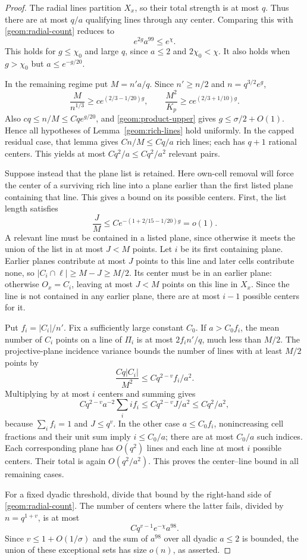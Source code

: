 \begin{proof}
The radial lines partition $X_x$, so their total strength is at most
$q$. Thus there are at most $q/a$ qualifying lines through any
center. Comparing this with \eqref{geom:radial-count} reduces to
\[
 e^{2g}a^{99}\leq e^\chi.
\]
This holds for $g\leq\chi_0$ and large $q$, since $a\leq2$ and
$2\chi_0<\chi$. It also holds when $g>\chi_0$ but
$a\leq e^{-g/20}$.

In the remaining regime put $M=n'a/q$. Since $n'\geq n/2$ and
$n=q^{3/2}e^g$,
\[
 \frac M{n^{1/3}}\geq c e^{(2/3-1/20)g},\qquad
 \frac{M^2}{K_p}\geq c e^{(2/3+1/10)g}.
\]
Also $cq\leq n/M\leq Cqe^{g/20}$, and
\eqref{geom:product-upper} gives $g\leq\sigma/2+O(1)$.
Hence all hypotheses of Lemma~\ref{geom:rich-lines} hold uniformly.
In the capped residual case, that lemma gives $Cn/M\leq Cq/a$
rich lines; each has $q+1$ rational centers. This yields at most
$Cq^2/a\leq Cq^2/a^2$ relevant pairs.

Suppose instead that the plane list is retained. Here own-cell removal
will force the center of a surviving rich line into a plane earlier
than the first listed plane containing that line. This gives a bound
on its possible centers. First, the list length satisfies
\[
 \frac JM\leq C e^{-(1+2/15-1/20)g}=o(1).
\]
A relevant line must be contained in a listed plane, since otherwise
it meets the union of the list in at most $J<M$ points. Let $i$
be its first containing plane. Earlier planes contribute at most
$J$ points to this line and later cells contribute none, so
$|C_i\cap\ell|\geq M-J\geq M/2$. Its center must be in an
earlier plane: otherwise $O_x=C_i$, leaving at most $J<M$ points
on this line in $X_x$. Since the line is not contained in any
earlier plane, there are at most $i-1$ possible centers for it.

Put $f_i=|C_i|/n'$. Fix a sufficiently large constant $C_0$.
If $a>C_0f_i$, the mean number of $C_i$ points on a line of
$\Pi_i$ is at most $2f_i n'/q$, much less than $M/2$.
The projective-plane incidence variance bounds the number of lines
with at least $M/2$ points by
\[
 \frac{Cq|C_i|}{M^2}
 \leq Cq^{2-v}f_i/a^2.
\]
Multiplying by at most $i$ centers and summing gives
\[
 Cq^{2-v}a^{-2}\sum_i i f_i
 \leq Cq^{2-v}J/a^2\leq Cq^2/a^2,
\]
because $\sum_i f_i=1$ and $J\leq q^v$. In the other case
$a\leq C_0f_i$, nonincreasing cell fractions and their unit sum
imply $i\leq C_0/a$; there are at most $C_0/a$ such indices.
Each corresponding plane has $O(q^2)$ lines and each line at
most $i$ possible centers. Their total is again $O(q^2/a^2)$.
This proves the center--line bound in all remaining cases.

For a fixed dyadic threshold, divide that bound by the right-hand
side of \eqref{geom:radial-count}. The number of centers where
the latter fails, divided by $n=q^{1+v}$, is at most
\[
 Cq^{v-1}e^{-\chi}a^{98}.
\]
Since $v\leq1+O(1/\sigma)$ and the sum of $a^{98}$ over all
dyadic $a\leq2$ is bounded, the union of these exceptional sets
has size $o(n)$, as asserted.
\end{proof}

